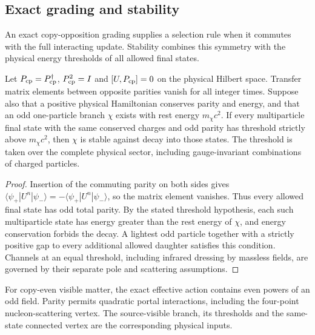 \subsection{Exact grading and stability}
\label{sec:operator-route}

An exact copy-opposition grading supplies a selection rule when it commutes with the full interacting update. Stability combines this symmetry with the physical energy thresholds of all allowed final states.

\begin{proposition}\label{prop:copy-odd}
Let $P_{\rm cp}=P_{\rm cp}^\dagger$, $P_{\rm cp}^2=I$ and $[U,P_{\rm cp}]=0$ on the physical Hilbert space. Transfer matrix elements between opposite parities vanish for all integer times. Suppose also that a positive physical Hamiltonian conserves parity and energy, and that an odd one-particle branch $\chi$ exists with rest energy $m_\chi c^2$. If every multiparticle final state with the same conserved charges and odd parity has threshold strictly above $m_\chi c^2$, then $\chi$ is stable against decay into those states. The threshold is taken over the complete physical sector, including gauge-invariant combinations of charged particles.
\end{proposition}
\begin{proof}
Insertion of the commuting parity on both sides gives
$\langle\psi_+|U^n|\psi_-\rangle=-\langle\psi_+|U^n|\psi_-\rangle$, so the matrix element vanishes. Thus every allowed final state has odd total parity. By the stated threshold hypothesis, each such multiparticle state has energy greater than the rest energy of $\chi$, and energy conservation forbids the decay. A lightest odd particle together with a strictly positive gap to every additional allowed daughter satisfies this condition. Channels at an equal threshold, including infrared dressing by massless fields, are governed by their separate pole and scattering assumptions.
\end{proof}

For copy-even visible matter, the exact effective action contains even powers of an odd field. Parity permits quadratic portal interactions, including the four-point nucleon-scattering vertex. The source-visible branch, its thresholds and the same-state connected vertex are the corresponding physical inputs.

